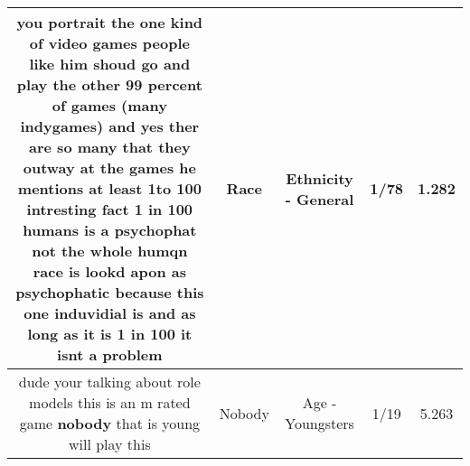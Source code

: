 \documentclass[11pt]{article}
\newlength\mylength
\begin{document}
\begin{center}
\begin{longtable}{|C{.65\mylength}|C{.30\mylength}|C{.12\mylength}|C{.12\mylength}|C{.12\mylength}|}
  \small you portrait the one kind of video games people like him shoud go and play the other 99 percent of games (many indygames) and yes ther are so many that they outway at the games he mentions at least 1to 100 intresting fact 1 in 100 humans is a psychophat not the whole humqn \textbf{race} is lookd apon as psychophatic because this one induvidial is and as long as it is 1 in 100 it isnt a problem\normalsize   & Race & Ethnicity - General & 1/78 & 1.282 \\  \hline
  \small dude your talking about role models this is an m rated game \textbf{nobody} that is young will play this\normalsize   & Nobody & Age - Youngsters & 1/19 & 5.263 \\  \hline

\end{longtable}
\end{center}
\end{document}
